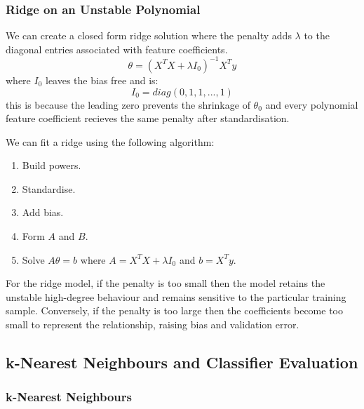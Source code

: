 \subsubsection{Ridge on an Unstable Polynomial}

We can create a closed form ridge solution where the penalty adds \(\lambda\) to the diagonal entries associated with feature coefficients.
\begin{equation}
    \theta = (X^TX + \lambda I_0)^{-1}X^Ty
\end{equation}
where \(I_0\) leaves the bias free and is:
\begin{equation}
    I_0 = diag(0,1,1,...,1)
\end{equation}
this is because the leading zero prevents the shrinkage of \(\theta_0\) and every polynomial feature coefficient recieves the same penalty after standardisation.

We can fit a ridge using the following algorithm:
\begin{enumerate}
    \item Build powers.
    \item Standardise.
    \item Add bias.
    \item Form \(A\) and \(B\).
    \item Solve \(A\theta = b\) where \(A = X^TX + \lambda I_0\) and \(b = X^Ty\).
\end{enumerate}

For the ridge model, if the penalty is too small then the model retains the unstable high-degree behaviour and remains sensitive to the particular training sample. 
Conversely, if the penalty is too large then the coefficients become too small to represent the relationship, raising bias and validation error.

\subsection{k-Nearest Neighbours and Classifier Evaluation}

\subsubsection{k-Nearest Neighbours}


